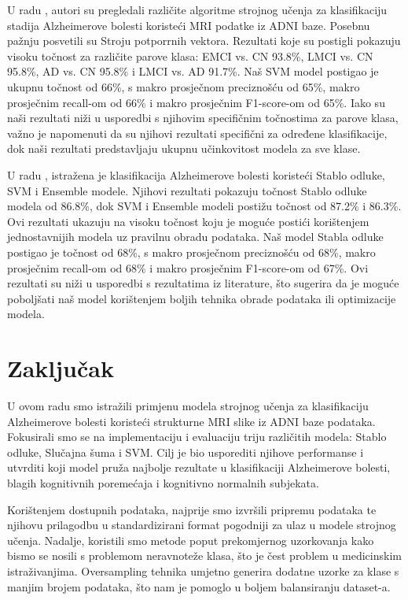 \documentclass[zavrsnirad,upload]{fer}
\begin{document}
U radu \cite{IRJET}, autori su pregledali različite algoritme strojnog učenja za klasifikaciju stadija Alzheimerove bolesti koristeći MRI podatke iz ADNI baze. Posebnu pažnju posvetili su Stroju potporrnih vektora. Rezultati koje su postigli pokazuju visoku točnost za različite parove klasa: EMCI vs. CN 93.8\%, LMCI vs. CN 95.8\%, AD vs. CN 95.8\% i LMCI vs. AD 91.7\%. Naš SVM model postigao je ukupnu točnost od 66\%, s makro prosječnom preciznošću od 65\%, makro prosječnim recall-om od 66\% i makro prosječnim F1-score-om od 65\%. Iako su naši rezultati niži u usporedbi s njihovim specifičnim točnostima za parove klasa, važno je napomenuti da su njihovi rezultati specifični za određene klasifikacije, dok naši rezultati predstavljaju ukupnu učinkovitost modela za sve klase.

U radu \cite{asi}, istražena je klasifikacija Alzheimerove bolesti koristeći Stablo odluke, SVM i Ensemble modele. Njihovi rezultati pokazuju točnost Stablo odluke modela od 86.8\%, dok SVM i Ensemble modeli postižu točnost od 87.2\% i 86.3\%. Ovi rezultati ukazuju na visoku točnost koju je moguće postići korištenjem jednostavnijih modela uz pravilnu obradu podataka. Naš model Stabla odluke postigao je točnost od 68\%, s makro prosječnom preciznošću od 68\%, makro prosječnim recall-om od 68\% i makro prosječnim F1-score-om od 67\%. Ovi rezultati su niži u usporedbi s rezultatima iz literature, što sugerira da je moguće poboljšati naš model korištenjem boljih tehnika obrade podataka ili optimizacije modela.

\chapter{Zaključak}
\label{pog:zakljucak}
U ovom radu smo istražili primjenu modela strojnog učenja za klasifikaciju Alzheimerove bolesti koristeći strukturne MRI slike iz ADNI baze podataka. Fokusirali smo se na implementaciju i evaluaciju triju različitih modela: Stablo odluke, Slučajna šuma i SVM. Cilj je bio usporediti njihove performanse i utvrditi koji model pruža najbolje rezultate u klasifikaciji Alzheimerove bolesti, blagih kognitivnih poremećaja i kognitivno normalnih subjekata.

Korištenjem dostupnih podataka, najprije smo izvršili pripremu podataka te njihovu prilagodbu u standardizirani format pogodniji za ulaz u modele strojnog učenja. Nadalje, koristili smo metode poput prekomjernog uzorkovanja kako bismo se nosili s problemom neravnoteže klasa, što je čest problem u medicinskim istraživanjima. Oversampling tehnika umjetno generira dodatne uzorke za klase s manjim brojem podataka, što nam je pomoglo u boljem balansiranju dataset-a.
\end{document}
